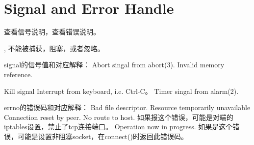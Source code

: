\section{Signal and Error Handle}
查看信号说明，查看错误说明。

, 不能被捕获，阻塞，或者忽略。

signal的信号值和对应解释：
  {Abort singal from abort(3).}
 {Invalid memory reference.}

   {Kill signal}
   {Interrupt from keyboard, i.e. Ctrl-C。}
  {Timer singal from alarm(2).}

errno的错误码和对应解释：
   {Bad file descriptor.}
  {Resource temporarily unavailable}
 {Connection reset by peer.}
 {No route to host. 如果报这个错误，可能是对端的iptables设置，禁止了tcp连接端口。}
 {Operation now in progress. 如果是这个错误，可能是设置非阻塞socket，在connect()时返回此错误码。}
